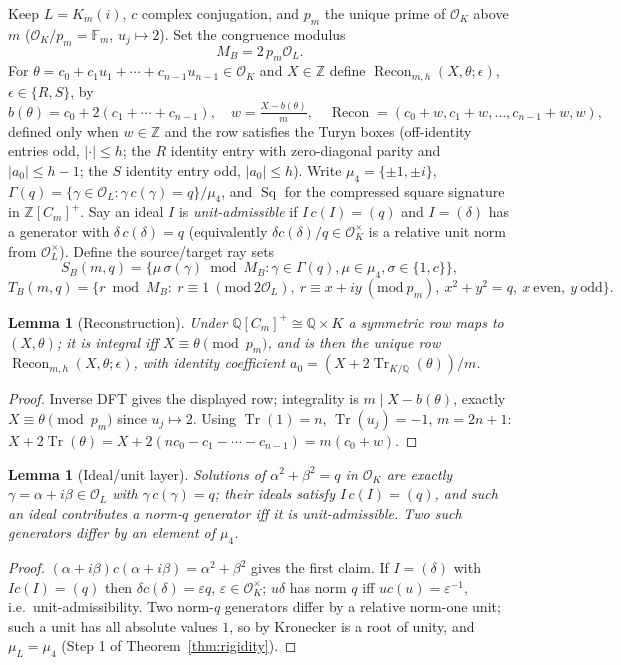 \documentclass[11pt]{article}
\theoremstyle{plain}
\newtheorem{lemma}[theorem]{Lemma}
\theoremstyle{definition}
\theoremstyle{remark}
\newcommand{\Z}{\mathbb Z}
\newcommand{\Q}{\mathbb Q}
\newcommand{\F}{\mathbb F}
\newcommand{\OK}{\mathcal O_K}
\newcommand{\OL}{\mathcal O_L}
\newcommand{\Tr}{\operatorname{Tr}}
\newcommand{\Recon}{\operatorname{Recon}}
\newcommand{\Sq}{\operatorname{Sq}}
\begin{document}
Keep $L=K_m(i)$, $c$ complex conjugation, and $p_m$ the unique prime of $\OK$
above $m$ ($\OK/p_m=\F_m$, $u_j\mapsto2$). Set the congruence modulus
\[
  M_B=2\,p_m\OL .
\]
For $\theta=c_0+c_1u_1+\cdots+c_{n-1}u_{n-1}\in\OK$ and $X\in\Z$ define
$\Recon_{m,h}(X,\theta;\epsilon)$, $\epsilon\in\{R,S\}$, by
\[
  b(\theta)=c_0+2(c_1+\cdots+c_{n-1}),\quad w=\tfrac{X-b(\theta)}{m},\quad
  \Recon=(c_0+w,c_1+w,\dots,c_{n-1}+w,w),
\]
defined only when $w\in\Z$ and the row satisfies the Turyn boxes (off-identity
entries odd, $|\cdot|\le h$; the $R$ identity entry with zero-diagonal parity
and $|a_0|\le h-1$; the $S$ identity entry odd, $|a_0|\le h$). Write
$\mu_4=\{\pm1,\pm i\}$, $\Gamma(q)=\{\gamma\in\OL:\gamma\,c(\gamma)=q\}/\mu_4$,
and $\Sq$ for the compressed square signature in $\Z[C_m]^+$. Say an ideal $I$
is \emph{unit-admissible} if $I\,c(I)=(q)$ and $I=(\delta)$ has a generator with
$\delta\,c(\delta)=q$ (equivalently $\delta c(\delta)/q\in\OK^\times$ is a
relative unit norm from $\OL^\times$). Define the source/target ray sets
\[
  S_B(m,q)=\{\mu\,\sigma(\gamma)\bmod M_B:\gamma\in\Gamma(q),\mu\in\mu_4,
    \sigma\in\{1,c\}\},
\]
\[
  T_B(m,q)=\{r\bmod M_B:\ r\equiv1\ (\mathrm{mod}\ 2\OL),\
    r\equiv x+iy\ (\mathrm{mod}\ p_m),\ x^2+y^2=q,\ x\ \text{even},\ y\ \text{odd}\}.
\]

\begin{lemma}[Reconstruction]\label{lem:recon}
Under $\Q[C_m]^+\cong\Q\times K$ a symmetric row maps to $(X,\theta)$; it is
integral iff $X\equiv\theta\pmod{p_m}$, and is then the unique row
$\Recon_{m,h}(X,\theta;\epsilon)$, with identity coefficient
$a_0=(X+2\Tr_{K/\Q}(\theta))/m$.
\end{lemma}

\begin{proof}
Inverse DFT gives the displayed row; integrality is $m\mid X-b(\theta)$, exactly
$X\equiv\theta\pmod{p_m}$ since $u_j\mapsto2$. Using $\Tr(1)=n$, $\Tr(u_j)=-1$,
$m=2n+1$: $X+2\Tr(\theta)=X+2(nc_0-c_1-\cdots-c_{n-1})=m(c_0+w)$.
\end{proof}

\begin{lemma}[Ideal/unit layer]\label{lem:idealunit}
Solutions of $\alpha^2+\beta^2=q$ in $\OK$ are exactly $\gamma=\alpha+i\beta\in
\OL$ with $\gamma\,c(\gamma)=q$; their ideals satisfy $I\,c(I)=(q)$, and such an
ideal contributes a norm-$q$ generator iff it is unit-admissible. Two such
generators differ by an element of $\mu_4$.
\end{lemma}

\begin{proof}
$(\alpha+i\beta)c(\alpha+i\beta)=\alpha^2+\beta^2$ gives the first claim. If
$I=(\delta)$ with $Ic(I)=(q)$ then $\delta c(\delta)=\varepsilon q$,
$\varepsilon\in\OK^\times$; $u\delta$ has norm $q$ iff $uc(u)=\varepsilon^{-1}$,
i.e.\ unit-admissibility. Two norm-$q$ generators differ by a relative
norm-one unit; such a unit has all absolute values $1$, so by Kronecker is a
root of unity, and $\mu_L=\mu_4$ (Step 1 of Theorem~\ref{thm:rigidity}).
\end{proof}
\end{document}
